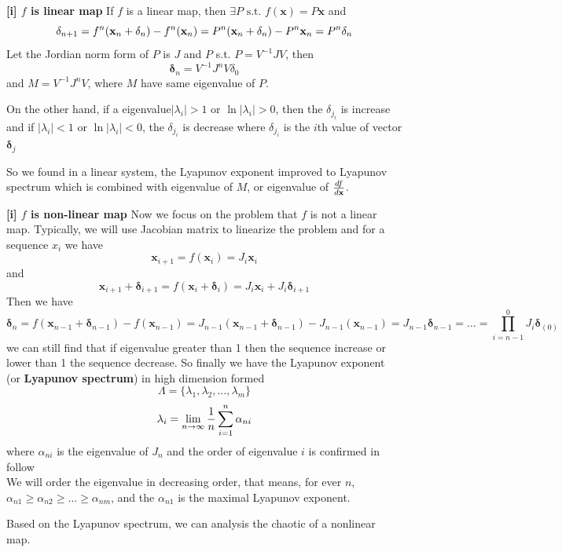 \documentclass[12pt]{article}
\theoremstyle{plain}
\begin{document}
\textbf{[i] $f$ is linear map}
If $f$ is a linear map, then $\exists P \text{ s.t. } f(\mathbf x) = P\mathbf x$ and 
$$
\mathbf\delta_{n + 1} = f^n(\mathbf x_n + \mathbf\delta_n) - f^n(\mathbf x_n) = P^n(\mathbf x_n + \mathbf\delta_n) - P^n\mathbf x_n= P^n\mathbf \mathbf\delta_n 
$$
Let the Jordian norm form of $P$ is $J$ and $P$ s.t. $P = V^{-1} J V$, then 
$$
\mathbf\delta_{n} = V^{-1} J^n V \delta_0
$$
and $M = V^{-1} J^n V$, where $M$ have same eigenvalue of $P$.

On the other hand, if a eigenvalue$|\lambda_i| > 1$ or $\ln|\lambda_i| > 0$, then the $\delta_{j_i}$ is increase and if $|\lambda_i| < 1$ or $\ln|\lambda_i| < 0$, the $\delta_{j_i}$ is decrease where $\delta_{j_i}$ is the $i$th value of vector $\mathbf \delta_j$

So we found in a linear system, the Lyapunov exponent improved to Lyapunov spectrum which is combined with eigenvalue of $M$, or eigenvalue of $df \over d\mathbf x$.


\textbf{[i] $f$ is non-linear map}
Now we focus on the problem that $f$ is not a linear map. Typically, we will use Jacobian matrix to linearize the problem and for a sequence $x_i$ we have 
$$
\mathbf x_{i+1} = f(\mathbf x_i) = J_i \mathbf x_i
$$
and 
$$
\mathbf x_{i+1} + \mathbf\delta_{i+1} = f(\mathbf x_i + \mathbf\delta_{i}) = J_i \mathbf x_i + J_i\mathbf\delta_{i+1}
$$
Then we have 
$$
\mathbf\delta_{n} = f(\mathbf x_{n-1} + \mathbf\delta_{n-1}) - f(\mathbf x_{n-1})
= J_{n-1} (\mathbf x_{n-1} + \mathbf\delta_{n-1}) - J_{n-1}(\mathbf x_{n-1}) = J_{n-1}\mathbf\delta_{n-1}
= \ldots = \prod_{i = n - 1}^{0}J_i\mathbf\delta_(0)
$$
we can still find that if eigenvalue greater than 1 then the sequence increase or lower than 1 the sequence decrease. So finally we have the Lyapunov exponent (or \textbf{Lyapunov spectrum}) in high dimension formed 
$$
\Lambda = \{\lambda_1, \lambda_2, \ldots, \lambda_m\}
$$
$$
\lambda_i = \lim_{n \rightarrow \infty}{1\over n}\sum_{i = 1}^{n}\alpha_{ni}
$$
where $\alpha_{ni}$ is the eigenvalue of $J_n$ and the order of eigenvalue $i$ is confirmed in follow
\\\noindent We will order the eigenvalue in decreasing order, that means, for ever $n$, $\alpha_{n1}\geq \alpha_{n2} \geq \ldots \geq \alpha_{nm}$, and the $\alpha_{n1}$ is the maximal Lyapunov exponent.

Based on the Lyapunov spectrum, we can analysis the chaotic of a nonlinear map.
\end{document}
